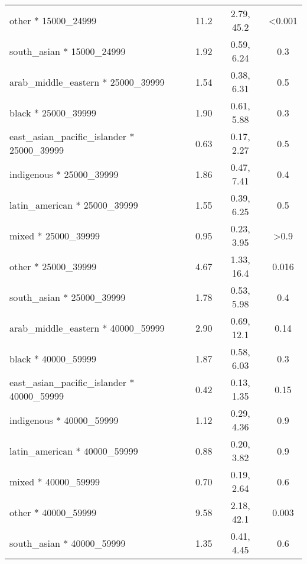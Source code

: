 \documentclass[
  letterpaper,
  DIV=11,
  numbers=noendperiod]{scrartcl}
\begin{document}
\begin{longtable}{lccc}
\hspace{1em}other * 15000\_24999 & 11.2 & 2.79, 45.2 & <0.001\\
\hspace{1em}south\_asian * 15000\_24999 & 1.92 & 0.59, 6.24 & 0.3\\
\addlinespace
\hspace{1em}arab\_middle\_eastern * 25000\_39999 & 1.54 & 0.38, 6.31 & 0.5\\
\hspace{1em}black * 25000\_39999 & 1.90 & 0.61, 5.88 & 0.3\\
\hspace{1em}east\_asian\_pacific\_islander * 25000\_39999 & 0.63 & 0.17, 2.27 & 0.5\\
\hspace{1em}indigenous * 25000\_39999 & 1.86 & 0.47, 7.41 & 0.4\\
\hspace{1em}latin\_american * 25000\_39999 & 1.55 & 0.39, 6.25 & 0.5\\
\addlinespace
\hspace{1em}mixed * 25000\_39999 & 0.95 & 0.23, 3.95 & >0.9\\
\hspace{1em}other * 25000\_39999 & 4.67 & 1.33, 16.4 & 0.016\\
\hspace{1em}south\_asian * 25000\_39999 & 1.78 & 0.53, 5.98 & 0.4\\
\hspace{1em}arab\_middle\_eastern * 40000\_59999 & 2.90 & 0.69, 12.1 & 0.14\\
\hspace{1em}black * 40000\_59999 & 1.87 & 0.58, 6.03 & 0.3\\
\addlinespace
\hspace{1em}east\_asian\_pacific\_islander * 40000\_59999 & 0.42 & 0.13, 1.35 & 0.15\\
\hspace{1em}indigenous * 40000\_59999 & 1.12 & 0.29, 4.36 & 0.9\\
\hspace{1em}latin\_american * 40000\_59999 & 0.88 & 0.20, 3.82 & 0.9\\
\hspace{1em}mixed * 40000\_59999 & 0.70 & 0.19, 2.64 & 0.6\\
\hspace{1em}other * 40000\_59999 & 9.58 & 2.18, 42.1 & 0.003\\
\addlinespace
\hspace{1em}south\_asian * 40000\_59999 & 1.35 & 0.41, 4.45 & 0.6\\

\end{longtable}
\end{document}
